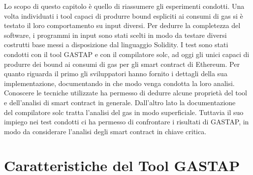 
Lo scopo di questo capitolo è quello di riassumere gli esperimenti condotti.\newline
\indent Una volta individuati i tool capaci di produrre bound espliciti ai consumi di gas si è testato il loro comportamento su input diversi. Per dedurre la completezza del software, i programmi in input sono stati scelti in modo da testare diversi costrutti base messi a disposizione dal linguaggio Solidity.\newline
\indent I test sono stati condotti con il tool GASTAP e con il compilatore solc, ad oggi gli unici capaci di produrre dei bound ai consumi di gas per gli smart contract di Ethereum. Per quanto riguarda il primo gli sviluppatori hanno fornito i dettagli della sua implementazione, documentando in che modo venga condotta la loro analisi. Conoscere le tecniche utilizzate ha permesso di dedurre alcune proprietà del tool e dell'analisi di smart contract in generale. Dall'altro lato la documentazione ~\cite{solidity-docs} del compilatore solc tratta l'analisi del gas in modo superficiale. Tuttavia il suo impiego nei test condotti ci ha permesso di confrontare i risultati di GASTAP, in modo da considerare l'analisi degli smart contract in chiave critica.\newline

\section{Caratteristiche del Tool GASTAP}

